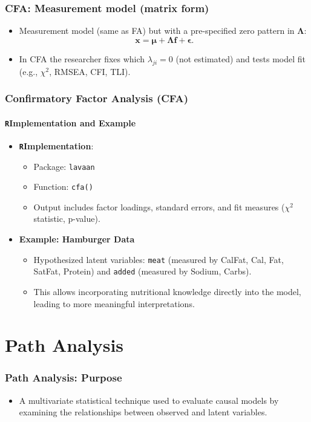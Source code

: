 \documentclass{beamer}
\newcommand{\R}{\texttt{R}}
\newcommand{\code}[1]{\texttt{#1}}
\begin{document}
\begin{frame}
    \frametitle{CFA: Measurement model (matrix form)}
    \begin{itemize}
        \item Measurement model (same as FA) but with a pre-specified zero pattern in $\mathbf{\Lambda}$:
        \[\mathbf{x}=\boldsymbol{\mu}+\mathbf{\Lambda}\mathbf{f}+\boldsymbol{\epsilon}.
        \]
        \item In CFA the researcher fixes which $\lambda_{ji}=0$ (not estimated) and tests model fit (e.g., $\chi^2$, RMSEA, CFI, TLI).
    \end{itemize}
\end{frame}

\begin{frame}
    \frametitle{Confirmatory Factor Analysis (CFA)}
    \framesubtitle{\R Implementation and Example}
    \begin{itemize}
        \item \textbf{\R Implementation}:
            \begin{itemize}
                \item Package: \code{lavaan}
                \item Function: \code{cfa()}
                \item Output includes factor loadings, standard errors, and fit measures ($\chi^2$ statistic, p-value).
            \end{itemize}
        \item \textbf{Example: Hamburger Data}
            \begin{itemize}
                \item Hypothesized latent variables: \code{meat} (measured by CalFat, Cal, Fat, SatFat, Protein) and \code{added} (measured by Sodium, Carbs).
                \item This allows incorporating nutritional knowledge directly into the model, leading to more meaningful interpretations.
            \end{itemize}
    \end{itemize}
\end{frame}

\section{Path Analysis}

\begin{frame}
    \frametitle{Path Analysis: Purpose}
    \begin{itemize}
        \item A multivariate statistical technique used to evaluate \alert{causal models} by examining the relationships between observed and latent variables.
    \end{itemize}
\end{frame}
\end{document}
